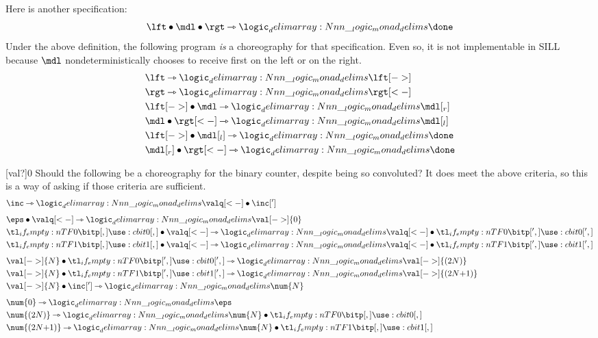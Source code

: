 Here is another specification:
\begin{equation*}
  \lft \fuse \mdl \fuse \rgt \lrimp \monad{\done}
\end{equation*}
Under the above definition, the following program \emph{is} a choreography for that specification.
Even so, it is not implementable in \ac{SILL} because $\mdl$ nondeterministically chooses to receive first on the left or on the right.
\begin{align*}
  &\lft \lrimp \monad{\lft[->]} \\
  &\rgt \lrimp \monad{\rgt[<-]} \\
  &\lft[->] \fuse \mdl \lrimp \monad{\mdl[_r]} \\
  &\mdl \fuse \rgt[<-] \lrimp \monad{\mdl[_l]} \\
  &\lft[->] \fuse \mdl[_l] \lrimp \monad{\done} \\
  &\mdl[_r] \fuse \rgt[<-] \lrimp \monad{\done}
\end{align*}

\NewPredicate{\valq}[val?]{0}%
%
Should the following be a choreography for the binary counter, despite being so convoluted?
It does meet the above criteria, so this is a way of asking if those criteria are sufficient.
\begin{align*}
  &\inc \lrimp \monad{\valq[<-] \fuse \inc[']} \\[1.5\jot]
  &\eps \fuse \valq[<-] \lrimp \monad{\val[->]{0}} \\
  &\bit{0} \fuse \valq[<-] \lrimp \monad{\valq[<-] \fuse \bit[']{0}} \\
  &\bit{1} \fuse \valq[<-] \lrimp \monad{\valq[<-] \fuse \bit[']{1}} \\[1.5\jot]
  &\val[->]{N} \fuse \bit[']{0} \lrimp \monad{\val[->]{(2N)}} \\
  &\val[->]{N} \fuse \bit[']{1} \lrimp \monad{\val[->]{(2N{+}1)}} \\
  &\val[->]{N} \fuse \inc['] \lrimp \monad{\num{N}} \\[1.5\jot]
  &\num{0} \lrimp \monad{\eps} \\
  &\num{(2N)} \lrimp \monad{\num{N} \fuse \bit{0}} \\
  &\num{(2N{+}1)} \lrimp \monad{\num{N} \fuse \bit{1}}
\end{align*}







